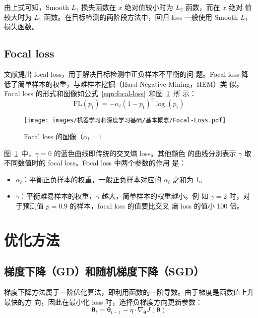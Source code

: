由上式可知，Smooth $L_1$ 损失函数在 $x$ 绝对值较小时为 $L_2$ 函数，而在 $x$ 绝对
值较大时为 $L_1$ 函数。在目标检测的两阶段方法中，回归 loss 一般使用 Smooth $L_1$
损失函数。

\subsection{Focal loss}

文献提出 focal loss，用于解决目标检测中正负样本不平衡的问
题。Focal loss 降低了简单样本的权重，与难样本挖掘（Hard Negative Mining，HEM）类
似。Focal loss 的形式和图像如公式~\ref{equ:focal-loss}~和图~\ref{fig:focal-loss}~所
示：
\begin{equation}
  \label{equ:focal-loss}
  \mathrm{FL}(p_{\mathrm{t}}) = - \alpha_t {(1-p_{\mathrm{t}})}^{\gamma} \log (p_{\mathrm{t}})
\end{equation}

\begin{figure}[ht]
  \centering
  \texttt{[image: images/机器学习和深度学习基础/基本概念/Focal-Loss.pdf]}
  \caption{Focal loss 的图像（$\alpha_t = 1$}\label{fig:focal-loss}
\end{figure}

图~\ref{fig:focal-loss}~中，$\gamma = 0$ 的蓝色曲线即传统的交叉熵 loss。其他颜色
的曲线分别表示 $\gamma$ 取不同数值时的 focal loss。Focal loss 中两个参数的作用
是：

\begin{itemize}
  \item $\alpha_t$：平衡正负样本的权重，一般正负样本对应的 $\alpha_t$ 之和为 1。
  \item $\gamma$：平衡难易样本的权重，$\gamma$ 越大，简单样本的权重越小。例
    如 $\gamma = 2$ 时，对于预测值 $p = 0.9$ 的样本，focal loss 的值要比交叉
    熵 loss 的值小 100 倍。
\end{itemize}

\section{优化方法}\label{sec:opt}

\subsection{梯度下降（GD）和随机梯度下降（SGD）}
梯度下降方法属于一阶优化算法，即利用函数的一阶导数。由于梯度是函数值上升最快的方
向，因此在最小化 loss 时，选择负梯度方向更新参数：
\begin{equation}
  \boldsymbol{\theta}_t = \boldsymbol{\theta}_{t-1} - \eta \cdot \nabla_{\boldsymbol{\theta}}J(\boldsymbol{\theta})
\end{equation}


